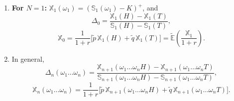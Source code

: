 \begin{enumerate}
    \item \textbf{For $N = 1$:} $\mathbb{X}_1(\omega_1) = (\mathbb{S}_1(\omega_1) - K)^+$, and
    \[\Delta_0 = \frac{\mathbb{X}_1(H) - \mathbb{X}_1(T)}{\mathbb{S}_1(H) - \mathbb{S}_1(T)},\]
    \[\mathbb{X}_0 = \frac{1}{1+r}\bigl[\tilde{p}\, \mathbb{X}_1(H) + \tilde{q}\, \mathbb{X}_1(T)\bigr] = \tilde{\mathbb{E}}\!\left(\frac{\mathbb{X}_1}{1+r}\right).\]

    \item In general,
    \[\Delta_n(\omega_1 \dots \omega_n) = \frac{\mathbb{X}_{n+1}(\omega_1 \dots \omega_n H) - \mathbb{X}_{n+1}(\omega_1 \dots \omega_n T)}{\mathbb{S}_{n+1}(\omega_1 \dots \omega_n H) - \mathbb{S}_{n+1}(\omega_1 \dots \omega_n T)},\]
    \[\mathbb{X}_n(\omega_1 \dots \omega_n) = \frac{1}{1+r}\bigl[\tilde{p}\, \mathbb{X}_{n+1}(\omega_1 \dots \omega_n H) + \tilde{q}\, \mathbb{X}_{n+1}(\omega_1 \dots \omega_n T)\bigr].\]


\end{enumerate}
